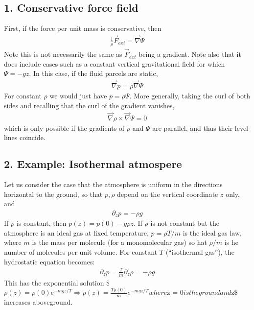 \documentclass[letterpaper,10pt,english]{jupyterBook}
\begin{document}
\subsection{1. Conservative force field}
\label{\detokenize{chapter1/Hydrostatics:conservative-force-field}}
\sphinxAtStartPar
First, if the force per unit mass is conservative, then
\begin{equation*}
\begin{split}
	\frac{1}{\rho} {\vec F}_{ext} = {\vec \nabla} \Psi
\end{split}
\end{equation*}
\sphinxAtStartPar
Note this is not necessarily the same as \({\vec F}_{ext}\) being a gradient.
Note also that it does include cases such as a constant vertical gravitational
field for which \(\Psi = - g z\). In this case, if the fluid parcels are static,
\begin{equation*}
\begin{split}
	{\vec \nabla} p = \rho 	{\vec \nabla} \Psi
\end{split}
\end{equation*}
\sphinxAtStartPar
For constant \(\rho\) we would just have \(p = \rho \Psi\). More generally, taking
the curl of both sides and recalling that the curl of the gradient vanishes,
\begin{equation*}
\begin{split}
	{\vec \nabla} \rho \times {\vec \nabla \Psi} = 0
\end{split}
\end{equation*}
\sphinxAtStartPar
which is only possible if the gradients of \(\rho\) and \(\Psi\) are parallel, and
thus their level lines coincide.


\subsection{2. Example: Isothermal atmospere}
\label{\detokenize{chapter1/Hydrostatics:example-isothermal-atmospere}}
\sphinxAtStartPar
Let us consider the case that the atmosphere is uniform
in the directions horizontal to the ground, so that \(p,\rho\) depend
on the vertical coordinate \(z\) only, and
\begin{equation*}
\begin{split}
	\partial_z p = - \rho g
\end{split}
\end{equation*}
\sphinxAtStartPar
If \(\rho\) is constant, then \(p(z) = p(0) - g \rho z\). If \(\rho\) is not
constant but the atmosphere is an ideal gas at fixed temperature,
\(p = \rho T/m\) is the ideal gas law, where \(m\) is the mass per molecule
(for a monomolecular gas) so hat \(\rho/m\) is he number of molecules per
unit volume. For constant \(T\) (“isothermal gas”), the hydrostatic equation
becomes:
\begin{equation*}
\begin{split}
	\partial_z p = \frac{T}{m} \partial_z \rho = - \rho g
\end{split}
\end{equation*}
\sphinxAtStartPar
This has the exponential solution
\$\(
	\rho(z) = \rho(0) e^{-m g z/T} \Rightarrow p(z) = \frac{T \rho(0)}{m} 
	e^{-mgz/T}
\)\(
where \)z = 0\( is the ground and \)z\$ increases aboveground.
\end{document}
